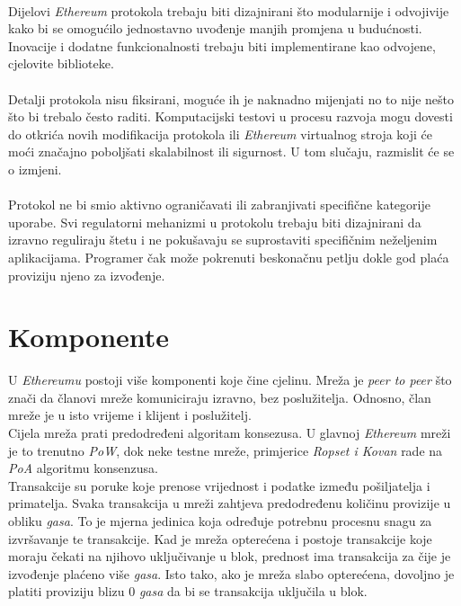 \documentclass[times, utf8, zavrsni, numeric]{fer}
\begin{document}
\paragraph{}
Dijelovi \emph{Ethereum} protokola trebaju biti dizajnirani što modularnije i odvojivije kako bi se omogućilo jednostavno uvođenje manjih promjena u budućnosti. Inovacije
i dodatne funkcionalnosti trebaju biti implementirane kao odvojene, cjelovite biblioteke.
\paragraph{}
Detalji protokola nisu fiksirani, moguće ih je naknadno mijenjati no to nije nešto što bi trebalo često raditi. Komputacijski testovi u procesu razvoja mogu dovesti do
otkrića novih modifikacija protokola ili \emph{Ethereum} virtualnog stroja  koji će moći značajno poboljšati skalabilnost ili sigurnost.
U tom slučaju, razmislit će se o izmjeni.
\paragraph{}
Protokol ne bi smio aktivno ograničavati ili zabranjivati specifične kategorije uporabe. Svi regulatorni mehanizmi u protokolu trebaju biti dizajnirani da izravno
reguliraju štetu i ne pokušavaju se suprostaviti specifičnim neželjenim aplikacijama. Programer čak može pokrenuti beskonačnu petlju dokle god plaća proviziju
njeno za izvođenje.\citep{whitepaper}

\section{Komponente}
U \emph{Ethereumu} postoji više komponenti koje čine cjelinu. Mreža je \emph{peer to peer} što znači da članovi mreže komuniciraju izravno, bez poslužitelja.
Odnosno, član mreže je u isto vrijeme i klijent i poslužitelj. \\
Cijela mreža prati predodređeni algoritam konsezusa. U glavnoj \emph{Ethereum} mreži je to trenutno \emph{PoW}, dok neke testne mreže, primjerice \emph{Ropset i Kovan} 
rade na \emph{PoA} algoritmu konsenzusa. \\
Transakcije su poruke koje prenose vrijednost i podatke između pošiljatelja i primatelja. Svaka transakcija u mreži zahtjeva predodređenu količinu provizije u obliku
\emph{gasa}. To je mjerna jedinica koja određuje potrebnu procesnu snagu za izvršavanje te transakcije.
Kad je mreža opterećena i postoje transakcije koje moraju čekati na njihovo uključivanje u blok, prednost ima transakcija za čije je izvođenje plaćeno više
\emph{gasa}. Isto tako, ako je mreža slabo opterećena, dovoljno je platiti proviziju blizu 0 \emph{gasa} da bi se transakcija uključila u blok.\citep{ethdocs}
\end{document}
